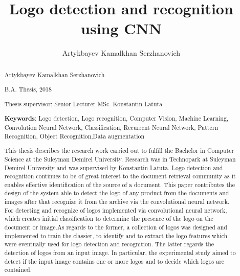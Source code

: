 \documentclass[14pt,epsfig,times]{report}
\title{Logo detection and recognition using CNN\vspace{-2cm}}
\author{Artykbayev Kamalkhan Serzhanovich}
\begin{document}
\makemstitle    %



\begin{abstract}
\par
\begin{center}
\centering Artykbayev Kamalkhan Serzhanovich
\end{center}

\par
\begin{center}
    \centering B.A. Thesis, 2018
\end{center}

\par
\begin{center}
\centering Thesis supervisor: Senior Lecturer MSc. Konstantin Latuta
\end{center}

\par
\noindent \textbf{Keywords}: Logo detection, Logo recognition, Computer Vision, Machine Learning, Convolution Neural Network, Classification, Recurrent Neural Network, Pattern Recognition, Object Recognition,Data augmentation

\noindent This thesis describes the research work carried out to fulfill the Bachelor in Computer Science at the Suleyman Demirel University. Research was in Technopark at Suleyman Demirel University and was supervised by Konstantin Latuta. 
Logo detection and recognition continues to be of great interest to the document retrieval community as it enables effective identification of the source of a document. This paper contributes the design of the system able to detect the logo of any product from the documents and images after that recognize it from the archive via the convolutional neural network. For detecting and recognize of logos implemented via convolutional neural network, which creates initial classification to determine the presence of the logo on the document or image.As regards to the former, a collection of logos was designed and implemented to train the classier, to identify and to extract the logo features which were eventually used for logo detection and recognition. The latter regards the detection of logos from an input image. In particular, the experimental study aimed to detect if the input image contains one or more logos and to decide which logos are contained.

\end{abstract}
\end{document}
